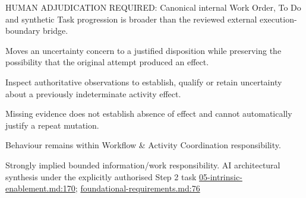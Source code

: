 HUMAN ADJUDICATION REQUIRED: Canonical internal Work Order, To Do and synthetic Task progression is broader than the reviewed external execution-boundary bridge.



Moves an uncertainty concern to a justified disposition while preserving the possibility that the original attempt produced an effect.



Inspect authoritative observations to establish, qualify or retain uncertainty about a previously indeterminate activity effect.



Missing evidence does not establish absence of effect and cannot automatically justify a repeat mutation.



Behaviour remains within Workflow \& Activity Coordination responsibility.


Strongly implied bounded information/work responsibility. AI architectural synthesis under the explicitly authorised Step 2 task \hyperref[evidence:d70bf9b0b197558f]{05-intrinsic-enablement.md:170}; \hyperref[evidence:f24cea53325717eb]{foundational-requirements.md:76}

